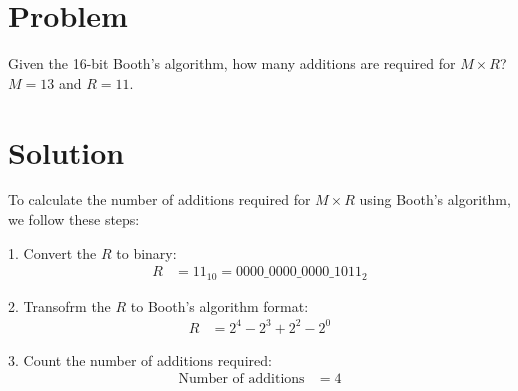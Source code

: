 \section*{Problem}
Given the 16-bit Booth's algorithm, how many additions are required for \( M \times R \)? $M=13$ and $R=11$.

\section*{Solution}
To calculate the number of additions required for \( M \times R \) using Booth's algorithm, we follow these steps:

1. Convert the $R$ to binary:
\begin{align*}
R & = 11_{10} = 0000\_0000\_0000\_1011_2
\end{align*}

2. Transofrm the $R$ to Booth's algorithm format:
\begin{align*}
R & = 2^{4} - 2^{3} + 2^{2} - 2^{0}
\end{align*}

3. Count the number of additions required:
\begin{align*}
\text{Number of additions} & = 4
\end{align*}


